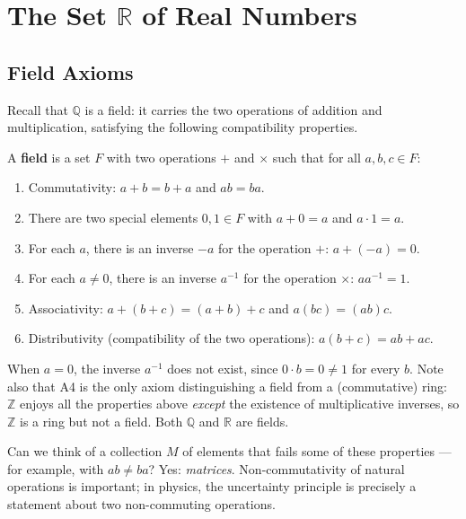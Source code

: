 \documentclass[11pt]{report}
\begin{document}

\section{The Set $\mathbb{R}$ of Real Numbers}

\subsection{Field Axioms}

Recall that $\mathbb{Q}$ is a field: it carries the two operations of addition and multiplication, satisfying the following compatibility properties.

\begin{defbox}
A \textbf{field} is a set $F$ with two operations $+$ and $\times$ such that for all $a, b, c \in F$:
\begin{enumerate}[label=\textbf{A\arabic*.}]
    \item Commutativity: $a + b = b + a$ and $ab = ba$.
    \item There are two special elements $0, 1 \in F$ with $a + 0 = a$ and $a \cdot 1 = a$.
    \item For each $a$, there is an inverse $-a$ for the operation $+$: \quad $a + (-a) = 0$.
    \item For each $a \neq 0$, there is an inverse $a^{-1}$ for the operation $\times$: \quad $a a^{-1} = 1$.
    \item Associativity: $a + (b + c) = (a + b) + c$ and $a(bc) = (ab)c$.
    \item Distributivity (compatibility of the two operations): $a(b + c) = ab + ac$.
\end{enumerate}
\end{defbox}

\begin{rembox}
When $a = 0$, the inverse $a^{-1}$ does not exist, since $0 \cdot b = 0 \neq 1$ for every $b$. Note also that A4 is the only axiom distinguishing a field from a (commutative) ring: $\mathbb{Z}$ enjoys all the properties above \emph{except} the existence of multiplicative inverses, so $\mathbb{Z}$ is a ring but not a field. Both $\mathbb{Q}$ and $\mathbb{R}$ are fields.
\end{rembox}

\begin{rembox}
Can we think of a collection $M$ of elements that fails some of these properties --- for example, with $ab \neq ba$? Yes: \emph{matrices}. Non-commutativity of natural operations is important; in physics, the uncertainty principle is precisely a statement about two non-commuting operations.
\end{rembox}
\end{document}
